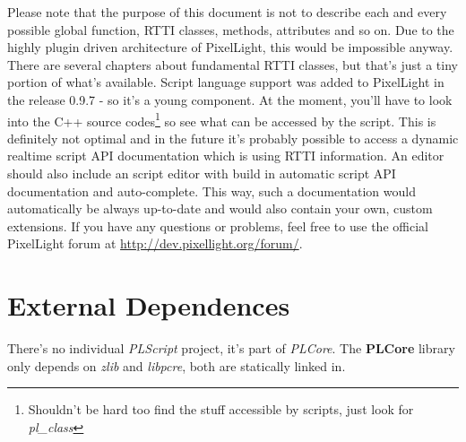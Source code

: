 Please note that the purpose of this document is not to describe each and every possible global function, RTTI classes, methods, attributes and so on. Due to the highly plugin driven architecture of PixelLight, this would be impossible anyway. There are several chapters about fundamental RTTI classes, but that's just a tiny portion of what's available. Script language support was added to PixelLight in the release 0.9.7 - so it's a young component. At the moment, you'll have to look into the C++ source codes\footnote{Shouldn't be hard too find the stuff accessible by scripts, just look for \emph{pl\_class}} so see what can be accessed by the script. This is definitely not optimal and in the future it's probably possible to access a dynamic realtime script API documentation which is using RTTI information. An editor should also include an script editor with build in automatic script API documentation and auto-complete. This way, such a documentation would automatically be always up-to-date and would also contain your own, custom extensions. If you have any questions or problems, feel free to use the official PixelLight forum at \url{http://dev.pixellight.org/forum/}.




\section{External Dependences}
There's no individual \emph{PLScript} project, it's part of \emph{PLCore}. The \textbf{PLCore} library only depends on \emph{zlib} and \emph{libpcre}, both are statically linked in.
